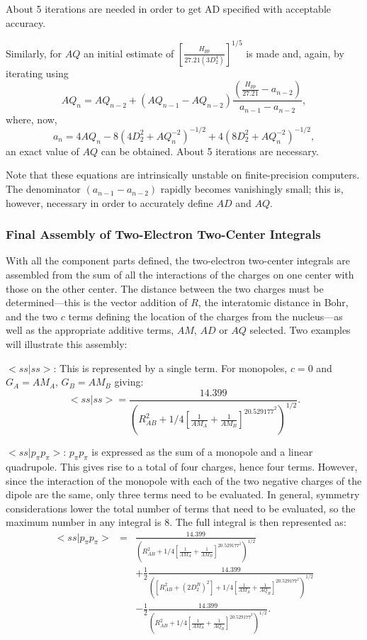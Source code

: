 About 5 iterations are needed in order to get AD specified
with acceptable accuracy.

 Similarly, for $AQ$ an initial estimate of
$[\frac{H_{pp}}{27.21(3D^4_2)}]^{1/5}$
is made and, again, by iterating using
$$
AQ_n = AQ_{n-2}+(AQ_{n-1}-AQ_{n-2})\frac{(\frac{H_{pp}}{27.21}-a_{n-2})}{a_{n-1}-a_{n-2}},
$$
where, now,
$$
a_n=4AQ_n-8(4D^2_2+AQ^{-2}_n)^{-1/2}+4(8D^2_2+AQ_n^{-2})^{-1/2},
$$
 an exact value of $AQ$ can be obtained. About 5 iterations
are necessary.

Note that these equations are intrinsically unstable on
finite-precision computers. The denominator $(a_{n-1} -a_{n-2} )$
rapidly becomes vanishingly small; this is, however, necessary in
order to accurately define $AD$ and $AQ$.

\subsubsection{Final Assembly of Two-Electron Two-Center Integrals}
 With all the component parts defined, the two-electron
two-center integrals are assembled from the sum of all the
interactions of the charges on one center with those on the
other center. The distance between the two charges must be
determined---this is the vector addition of $R$, the
interatomic distance in Bohr, and the two $c$ terms defining
the location of the charges from the nucleus---as well as
the appropriate additive terms, $AM$, $AD$ or $AQ$ selected. Two
examples will illustrate this assembly:

$ <ss|ss>$: This is represented by a single term. For
monopoles, $c=0$ and $G_A=AM_A$, $G_B=AM_B$ giving:
$$
<ss|ss> = \frac{14.399}
{(R^2_{AB}+1/4[\frac{1}{AM_A} + \frac{1}{AM_B}]^20.529177^2)^{1/2}}.
$$

$<ss|p_{\pi}p_{\pi}>$: $p_{\pi}p_{\pi}$ is expressed as the sum of a monopole
and a linear quadrupole. This gives rise to a total of four
charges, hence four terms. However, since the interaction
of the monopole with each of the two negative charges of the
dipole are the same, only three terms need to be evaluated.
In  general, symmetry considerations lower the total number of
terms that need to be evaluated, so the maximum number in
any integral is 8. The full integral is then represented as:
\begin{eqnarray}
<ss|p_{\pi}p_{\pi}>& =&
\frac{14.399}
{(R^2_{AB}+1/4[\frac{1}{AM_A} + \frac{1}{AM_B}]^20.529177^2)^{1/2}} \nonumber \\
&&+\frac{1}{2}\frac{14.399}
{([R^2_{AB}+(2D_2^B)^2]+1/4[\frac{1}{AM_A} + \frac{1}{AQ_B}]^20.529177^2)^{1/2}} \nonumber \\
&&-\frac{1}{2}\frac{14.399}
{(R^2_{AB}+1/4[\frac{1}{AM_A} + \frac{1}{AQ_B}]^20.529177^2)^{1/2}}.  \nonumber
\end{eqnarray}
